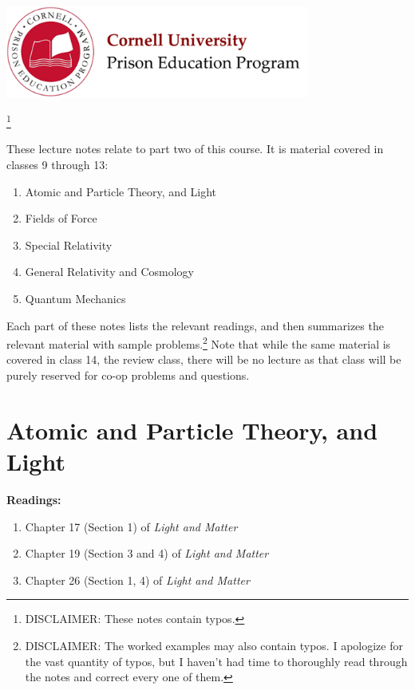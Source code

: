 \documentclass[12pt]{article}
\begin{document}
\begin{center}
\includegraphics[width=10cm]{../images/logo.png}
\end{center}

\begin{center}
\footnote{DISCLAIMER: These notes contain typos.}

\vspace{0.1in}
\end{center}

\noindent These lecture notes relate to part two of this course. It is material covered in classes 9 through 13:
\begin{enumerate}
\item Atomic and Particle Theory, and Light
\item Fields of Force
\item Special Relativity
\item General Relativity and Cosmology
\item Quantum Mechanics
\end{enumerate}

\noindent Each part of these notes lists the relevant readings, and then summarizes the relevant material with sample problems.\footnote{DISCLAIMER: The worked examples may also contain typos. I apologize for the vast quantity of typos, but I haven't had time to thoroughly read through the notes and correct every one of them.} Note that while the same material is covered in class 14, the review class, there will be no lecture as that class will be purely reserved for co-op problems and questions.

\section{Atomic and Particle Theory, and Light}

\noindent \textbf{Readings:}
\begin{enumerate}
	\item Chapter 17 (Section 1) of \textit{Light and Matter}
	\item Chapter 19 (Section 3 and 4) of \textit{Light and Matter}
	\item Chapter 26 (Section 1, 4) of \textit{Light and Matter} 
\end{enumerate}
\end{document}

